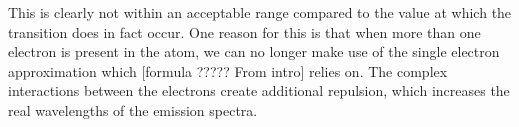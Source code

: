 This is clearly not within an acceptable range compared to the value at which the transition does in fact occur.
One reason for this is that when more than one electron is present in the atom, we can no longer make use of the
single electron approximation which [formula ????? From intro] relies on. The complex interactions between the electrons
create additional repulsion, which increases the real wavelengths of the emission spectra.
\begin{table}

    \begin{adjustwidth}{-1cm}{-1cm}
\end{adjustwidth}
\end{table}

